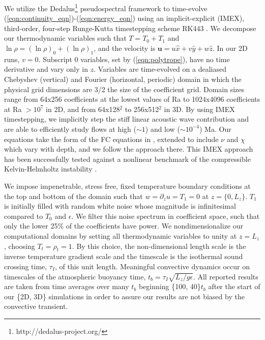 \documentclass[aps, prl, twocolumn, nofootinbib, groupedaddress, amsfonts, amssymb, amsmath]{revtex4-1}
\begin{document}
We utilize the 
Dedalus\footnote{http://dedalus-project.org/} \cite{burns&all2016} 
pseudospectral framework to time-evolve  
(\ref{eqn:continuity_eqn})-(\ref{eqn:energy_eqn}) 
using an implicit-explicit (IMEX), third-order, four-step 
Runge-Kutta timestepping scheme RK443 \cite{ascher&all1997}.  
We decompose our thermodynamic variables such that $T = T_0 + T_1$ and
$\ln\rho = (\ln\rho)_0 + (\ln\rho)_1$, 
and the velocity is $\bm{u} = u\hat{x} + v\hat{y} +  w\hat{z}$.
In our 2D runs, $v = 0$.
Subscript 0 variables, set by (\ref{eqn:polytrope}), 
have no time derivative and vary only in $z$.
Variables are time-evolved on a dealiased Chebyshev (vertical)
and Fourier (horizontal, periodic) domain in which the
physical grid dimensions are 3/2 the size of the coefficient grid.  
Domain sizes range from
64x256 coefficients at the lowest values of 
Ra to 1024x4096 coefficients at Ra $> 10^{7}$ in 2D,
and from 64x128$^2$ to  256x512$^2$ in 3D. 
By using IMEX timestepping, we implicitly step the 
stiff linear acoustic wave contribution and are able to
efficiently study flows at high ($\sim 1$) 
and low ($\sim 10^{-4}$) Ma.  Our equations take the form
of the FC equations in \cite{lecoanet&all2014}, extended to include
$\nu$ and $\chi$ which vary with depth, and we follow the approach there.
This IMEX approach has been successfully 
tested against a nonlinear benchmark  of the compressible 
Kelvin-Helmholtz instability \cite{Lecoanet_et_al_2016_KH}.

We impose impenetrable, stress free, fixed temperature boundary conditions at
the top and bottom of the domain such that 
$w = \partial_z u = T_1 = 0$ at $z = \{0, L_z\}$. 
$T_1$ is initially filled with
random white noise whose magnitude is infinitesimal
compared to $T_0$ and $\epsilon$.
We filter this noise spectrum in coefficient space, 
such that only the lower 25\% of the coefficients
have power. We nondimensionalize our computational domains by setting
all thermodynamic variables to unity at $z = L_z$, choosing
$T_t = \rho_t = 1$.  By this choice, the non-dimensional
length scale is the inverse temperature gradient scale and the 
timescale is the isothermal sound crossing time, 
$\tau_I$, of this unit length.
Meaningful convective dynamics occur on 
timescales of the atmospheric buoyancy time,
$t_b = \tau_I \sqrt{L_z/g\epsilon}$. 
All reported results are taken from time averages
over many $t_b$ beginning \{100, 40\}$t_b$
after the start of our \{2D, 3D\} simulations in order to
assure our results are not biased by the convective transient.
\end{document}
